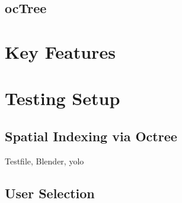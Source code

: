\subsection{ocTree}
\label{sec:octree}

\section{Key Features}
\label{sec:key_features}

\section{Testing Setup}
\label{sec:testing_setup}

\subsection{Spatial Indexing via Octree}
\label{sec:spatial_indexing_via_octree}
Testfile, Blender, yolo

\subsection{User Selection}

